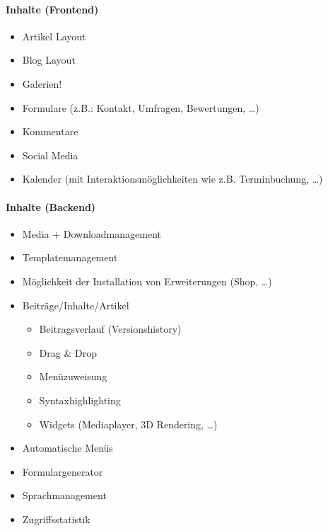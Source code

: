 	\paragraph{Inhalte (Frontend)}
		\begin{itemize}
			\item Artikel Layout
			\item Blog Layout
			\item Galerien!
			\item Formulare (z.B.: Kontakt, Umfragen, Bewertungen, …)
			\item Kommentare
			\item Social Media
			\item Kalender (mit Interaktionsmöglichkeiten wie z.B. Terminbuchung, …)
		\end{itemize}
		
	\paragraph{Inhalte (Backend)}
		\begin{itemize}
			\item Media + Downloadmanagement
			\item Templatemanagement
			\item Möglichkeit der Installation von Erweiterungen (Shop, …)
			\item Beiträge/Inhalte/Artikel
			\begin{itemize}
				\item Beitragsverlauf (Versionshistory)
				\item Drag \& Drop
				\item Menüzuweisung
				\item Syntaxhighlighting
				\item Widgets (Mediaplayer, 3D Rendering, …)
			\end{itemize}
			\item Automatische Menüs
			\item Formulargenerator
			\item Sprachmanagement
			\item Zugriffsstatistik
		\end{itemize}
